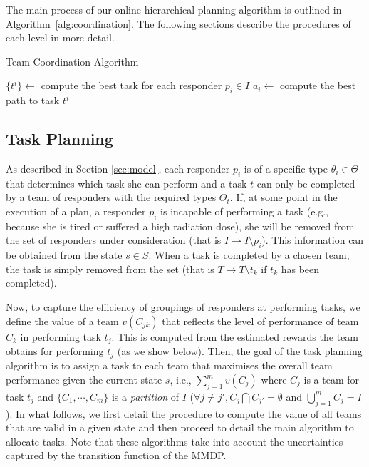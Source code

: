 The main process of our online hierarchical planning algorithm is
outlined in Algorithm~\ref{alg:coordination}. The following
sections describe the procedures of each level in more detail.

\begin{algorithm}[t]
  \caption{Team Coordination Algorithm}
  \label{alg:coordination}
  \Indm
  \Indp\BlankLine
  $\{ t^i \} \gets$ compute the best task for each responder $p_i\in I$ \;
   {
    $a_i \gets$ compute the best path to task $t^i$ \;
  }
\end{algorithm}


\subsection{Task Planning}
\label{sec:taskplanning}
\noindent As described in Section \ref{sec:model}, each responder
$p_i$ is of a specific type $\theta_i \in \Theta$ that determines which task
she can perform and  a task $t$ can only be completed by a team of
responders with the required types $\Theta_t$. If, at some point in
the execution of a plan, a responder $p_i$ is incapable of
performing a task (e.g., because she is tired or suffered a high
radiation dose), she will be removed from the set of responders
under consideration (that is $I \to I \setminus p_i$). This
information can be obtained from the state $s \in S$. When a task
is completed by a chosen team, the task is simply removed from the
set (that is $T \to T\setminus t_k$ if $t_k$ has been completed).

Now, to capture the efficiency of groupings of responders at
performing tasks, we define the value
of a team $v(C_{jk})$ that reflects the level of performance of
team $C_k$ in performing task $t_j$. This is computed from the estimated rewards the team obtains for performing $t_j$ (as we show below).  Then, the goal of the task
planning algorithm is to assign a task to each team that maximises
the overall team performance given the current state $s$, i.e.,
$\sum_{j=1}^m v(C_{j})$ where $C_j$ is a team for task $t_j$ and $\{
C_1, \cdots, C_m \}$ is a {\em partition} of $I$ ($\forall j\neq
j', C_j \bigcap C_{j'} = \emptyset$ and $\bigcup_{j=1}^m C_j=I$).
In what follows, we first detail the procedure to compute the value
of all teams that are valid in a given state and then proceed to
detail the main algorithm to allocate tasks. Note that these
algorithms take into account the uncertainties captured by the
transition function of the MMDP.


